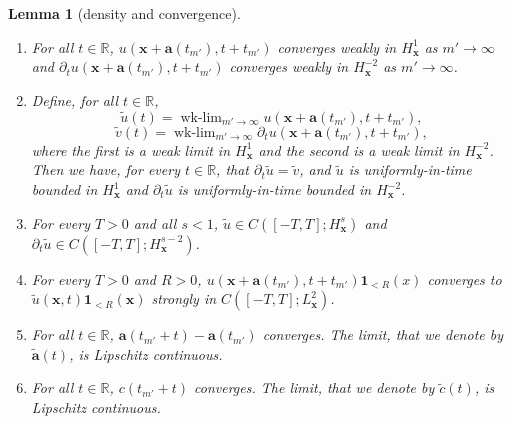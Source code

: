 \documentclass[12pt,letterpaper]{amsart}
\newtheorem{lemma}[theorem]{Lemma}
\theoremstyle{remark}
\numberwithin{equation}{section}
\numberwithin{theorem}{section}
\numberwithin{table}{section}
\begin{document}
\begin{lemma}[density and convergence]
\label{L:wk-3} \quad
\begin{enumerate}
\item 
For all $t\in \mathbb{R}$, $u(\mathbf{x}+\mathbf{a}(t_{m'}),t+t_{m'})$ converges weakly in $H_{\mathbf{x}}^1$ as $m'\to\infty$ and $\partial_t u(\mathbf{x}+\mathbf{a}(t_{m'}),t+t_{m'})$ converges weakly in $H_{\mathbf{x}}^{-2}$ as $m'\to\infty$.   
\item 
\emph{Define}, for all $t\in \mathbb{R}$,
$$
\tilde u(t) = \operatorname{wk-lim}_{m'\to \infty} u(\mathbf{x}+\mathbf{a}(t_{m'}),t+t_{m'}),
$$
$$
\tilde v(t) = \operatorname{wk-lim}_{m'\to \infty} \partial_t u(\mathbf{x}+\mathbf{a}(t_{m'}),t+t_{m'}),
$$
where the first is a weak limit in $H^1_{\mathbf{x}}$ and the second is a weak limit in $H^{-2}_{\mathbf{x}}$.  Then we have, for every $t\in \mathbb{R}$, that $\partial_t \tilde u = \tilde v$, and $\tilde u$ is uniformly-in-time bounded in $H^1_{\mathbf{x}}$ and $\partial_t \tilde u$ is uniformly-in-time bounded in $H^{-2}_{\mathbf{x}}$.
\item 
For every $T>0$ and all $s<1$, $\tilde u \in C([-T,T]; H^s_{\mathbf{x}})$ and $\partial_t \tilde u \in C([-T,T]; H^{s-2}_{\mathbf{x}})$.
\item 
For every $T>0$ and $R>0$, $u(\mathbf{x}+\mathbf{a}(t_{m'}),t+t_{m'})\mathbf{1}_{<R}(x)$ converges to $\tilde u(\mathbf{x},t)\mathbf{1}_{<R}(\mathbf{x})$ strongly in $C([-T,T]; L_{\mathbf{x}}^2)$.
\item 
For all $t\in \mathbb{R}$, $\mathbf{a}(t_{m'}+t)-\mathbf{a}(t_{m'})$ converges.  The limit, that we denote by $\tilde{\mathbf{a}}(t)$, is Lipschitz continuous.
\item 
For all $t\in \mathbb{R}$, $c(t_{m'}+t)$ converges.  The limit, that we denote by $\tilde c(t)$, is Lipschitz continuous.
\end{enumerate}
\end{lemma}
\end{document}
